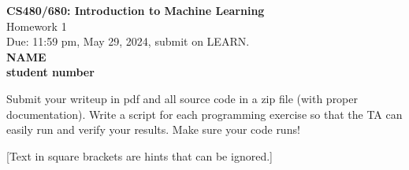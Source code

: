 \documentclass[10pt]{article}
\newcommand{\red}[1]{{\color{red}#1}}
\newcommand{\green}[1]{{\color{green}#1}}
\begin{document}
\begin{center}
\large{\textbf{CS480/680: Introduction to Machine Learning} \\ Homework 1\\ \red{Due: 11:59 pm, May 29, 2024}, \red{submit on LEARN}.} \\

{\bf \green{NAME}} \\
{\bf \green{student number}}

\end{center}

\begin{center}
Submit your writeup in pdf and all source code in a zip file (with proper documentation). Write a script for each programming exercise so that the TA can easily run and verify your results. Make sure your code runs!

[Text in square brackets are hints that can be ignored.]
\end{center}
\end{document}

